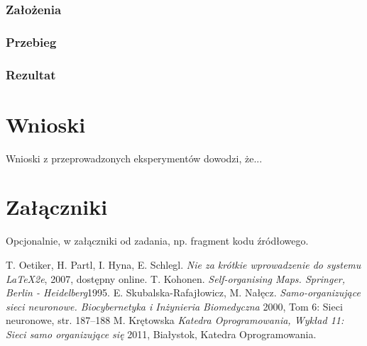 \documentclass[12pt]{article}
\begin{document}
\subsubsection{Założenia}

\subsubsection{Przebieg}

\subsubsection{Rezultat}
\newpage

\section{Wnioski}

Wnioski z przeprowadzonych eksperymentów dowodzi, że...



\section{Załączniki}

Opcjonalnie, w załączniki od zadania,
np. fragment kodu źródłowego.



\renewcommand\refname{Bibliografia}

\begin{thebibliography}{0}
 T. Oetiker, H. Partl, I. Hyna, E. Schlegl.
\textsl{Nie za krótkie wprowadzenie do systemu \LaTeX2e}, 2007, dostępny online.
 T. Kohonen.
\textsl{Self-organising Maps. Springer, Berlin - Heidelberg}1995.
 E. Skubalska-Rafajłowicz, M. Nałęcz.
\textsl{Samo-organizujące sieci neuronowe. Biocybernetyka i Inżynieria Biomedyczna }2000, Tom 6: Sieci neuronowe, str. 187–188
M. Krętowska
\textsl{Katedra Oprogramowania, Wykład 11: Sieci samo organizujące się} 2011, Białystok, Katedra Oprogramowania.
\end{thebibliography}
\end{document}
